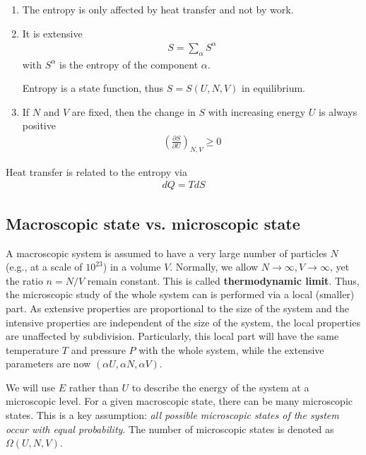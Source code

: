 \begin{enumerate}
\begin{enumerate}
  \item  The entropy is only affected by heat transfer and not by work.

  \item It is extensive 
    \begin{eqnarray*}
      S = \sum_\alpha S^\alpha
    \end{eqnarray*}
    with $S^\alpha$ is the entropy of the component $\alpha$.

    Entropy is a state function, thus $S=S(U,N,V)$ in equilibrium. 
    \item If $N$ and $V$ are fixed, then the change in $S$ with
      increasing energy $U$ is always positive
      \begin{eqnarray*}
        \left(\frac{\partial S}{\partial U}\right)_{N,V} \ge 0
      \end{eqnarray*}

  \end{enumerate}

  Heat transfer is related to the entropy via 
  \begin{eqnarray*}
    dQ = TdS
  \end{eqnarray*}

\end{enumerate}

\subsection{Macroscopic state vs. microscopic state}
\label{sec:macr-state-vs}

A macroscopic system is assumed to have a very large number of
particles $N$ (e.g., at a scale of $10^{23}$) in a volume
$V$. Normally, we allow $N\rightarrow \infty, V\rightarrow \infty$,
yet the ratio $n=N/V$ remain constant. This is called
{\bf thermodynamic limit}. Thus, the microscopic study of the whole
system can is performed via a local (smaller) part.  As extensive
properties are proportional to the size of the system and the
intensive properties are independent of the size of the system, the
local properties are unaffected by subdivision. Particularly, this
local part will have the same temperature $T$ and pressure $P$ with
the whole system, while the extensive parameters are now $(\alpha U,
\alpha N, \alpha V)$.

We will use $E$ rather than $U$ to describe the energy of the system
at a microscopic level. For a given macroscopic state, there can be
many microscopic states. This is a key assumption:
{\it all possible microscopic states of the system occur with equal
  probability}. The number of microscopic states is denoted as
$\Omega(U,N,V)$.

